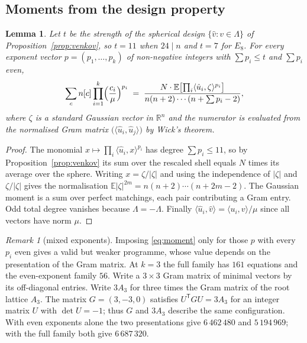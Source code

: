 \documentclass[11pt]{amsart}
\newtheorem{lemma}[theorem]{Lemma}
\theoremstyle{remark}
\newtheorem{remark}[theorem]{Remark}
\newcommand{\ip}[2]{\langle #1,#2\rangle}
\newcommand{\R}{\mathbb{R}}
\begin{document}
\subsection{Moments from the design property}

\begin{lemma}\label{lem:moments}
Let $t$ be the strength of the spherical design $\{\hat v:v\in\Lambda\}$ of
Proposition~\ref{prop:venkov}, so $t=11$ when $24\mid n$ and $t=7$ for $E_8$. For
every exponent vector $p=(p_1,\dots,p_k)$ of non-negative integers with
$\sum p_i\le t$ and $\sum p_i$ even,
\begin{equation}\label{eq:moment}
  \sum_{c} n[c]\prod_{i=1}^{k}\Bigl(\frac{c_i}{\mu}\Bigr)^{p_i}
  \;=\;
  \frac{N\cdot \mathbb{E}\bigl[\prod_i \ip{\hat u_i}{\zeta}^{p_i}\bigr]}
       {n(n+2)\cdots(n+\textstyle\sum p_i-2)},
\end{equation}
where $\zeta$ is a standard Gaussian vector in $\R^n$ and the numerator is
evaluated from the normalised Gram matrix $\bigl(\ip{\hat u_i}{\hat u_j}\bigr)$
by Wick's theorem.
\end{lemma}

\begin{proof}
The monomial $x\mapsto\prod_i\ip{\hat u_i}{x}^{p_i}$ has degree $\sum p_i\le11$,
so by Proposition~\ref{prop:venkov} its sum over the rescaled shell equals $N$
times its average over the sphere. Writing $x=\zeta/|\zeta|$ and using the
independence of $|\zeta|$ and $\zeta/|\zeta|$ gives the normalisation
$\mathbb{E}|\zeta|^{2m}=n(n+2)\cdots(n+2m-2)$. The Gaussian moment is a sum over
perfect matchings, each pair contributing a Gram entry. Odd total degree
vanishes because $\Lambda=-\Lambda$. Finally
$\ip{\hat u_i}{\hat v}=\ip{u_i}{v}/\mu$ since all vectors have norm $\mu$.
\end{proof}

\begin{remark}[mixed exponents]\label{rem:mixed}
Imposing \eqref{eq:moment} only for those $p$ with every $p_i$ even gives a valid
but weaker programme, whose value depends on the presentation of the Gram matrix.
At $k=3$ the full family has $161$ equations and the even-exponent family $56$.
Write a $3\times3$ Gram matrix of minimal vectors by its off-diagonal entries.
Write $3A_3$ for three times the Gram matrix of the root lattice $A_3$. The
matrix $G=(3,-3,0)$ satisfies $U^{\mathsf T}GU=3A_3$ for an integer matrix $U$
with $\det U=-1$; thus $G$ and $3A_3$ describe the same configuration. With even
exponents alone the two presentations give $6\,462\,480$ and $5\,194\,969$; with
the full family both give $6\,687\,320$.
\end{remark}
\end{document}
